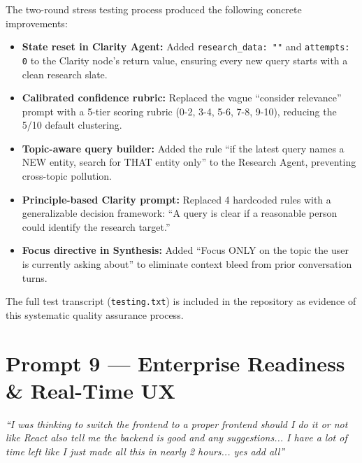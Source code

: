 \documentclass[12pt, a4paper]{article}
\begin{document}
\begin{impactbox}
The two-round stress testing process produced the following concrete improvements:
\begin{itemize}[leftmargin=1.5em]
    \item \textbf{State reset in Clarity Agent:} Added \texttt{research\_data: ""} and \texttt{attempts: 0} to the Clarity node's return value, ensuring every new query starts with a clean research slate.
    \item \textbf{Calibrated confidence rubric:} Replaced the vague ``consider relevance'' prompt with a 5-tier scoring rubric (0-2, 3-4, 5-6, 7-8, 9-10), reducing the 5/10 default clustering.
    \item \textbf{Topic-aware query builder:} Added the rule ``if the latest query names a NEW entity, search for THAT entity only'' to the Research Agent, preventing cross-topic pollution.
    \item \textbf{Principle-based Clarity prompt:} Replaced 4 hardcoded rules with a generalizable decision framework: ``A query is clear if a reasonable person could identify the research target.''
    \item \textbf{Focus directive in Synthesis:} Added ``Focus ONLY on the topic the user is currently asking about'' to eliminate context bleed from prior conversation turns.
\end{itemize}

The full test transcript (\texttt{testing.txt}) is included in the repository as evidence of this systematic quality assurance process.
\end{impactbox}

\section{Prompt 9 — Enterprise Readiness \& Real-Time UX}

\begin{promptbox}
\textit{``I was thinking to switch the frontend to a proper frontend should I do it or not like React also tell me the backend is good and any suggestions... I have a lot of time left like I just made all this in nearly 2 hours... yes add all''}
\end{promptbox}
\end{document}
